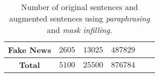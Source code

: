 \begin{table}[!ht]
{\begin{tabular}{cccccl}
\textbf{Fake News}   &      $2605$                                                                                        &     $13025$                                                                                                                         &    $487829$                                                                                                                              &                                                                                                                                                   \\ \midrule
\textbf{Total}       &       $5100$                                                                                       &      $25500$                                                                                                                        &     $876784$                                                                                                                             &                                                                                                                                                   \\ \bottomrule
\end{tabular}
}

\caption {Number of original sentences and augmented sentences using \textit{paraphrasing} and \textit{mask infilling}.}
\label{tab:SEPSIS_corpus}
\vspace{-5mm}
\end{table}

\begin{comment}
We addressed several issues in our dataset to improve the reliability of the annotations and reduce redundancies. Many data points were assigned the correct reason behind their choice but were assigned the wrong category. For example, certain statements were placed under the 'distortion' category, but the provided reason suggested their categorization to be 'speculation.' Additionally, we re-annotated several incomplete entries where annotators had entered the statement category but missed providing further information on the color of lies or intent of lies.
\end{comment}



